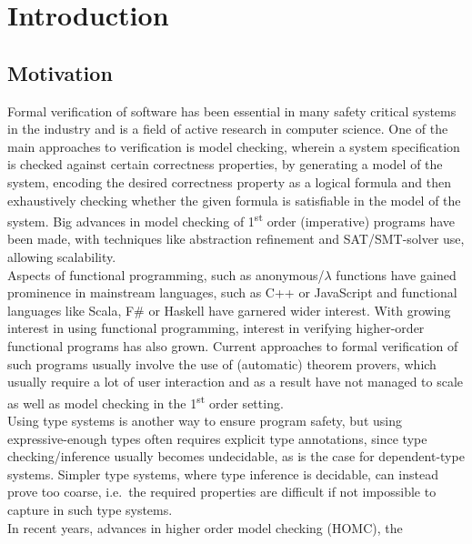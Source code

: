 \documentclass[a4paper, 12pt, twoside]{style/ociamthesis}
\theoremstyle{plain}
\theoremstyle{definition}
\theoremstyle{remark}
\begin{document}
 \hypersetup{linkcolor=cyan} 

\chapter{Introduction}\label{introduction}

\label{chap:intro}

\section{Motivation}\label{motivation}

Formal verification of software has been essential in many safety
critical systems in the industry and is a field of active research in
computer science. One of the main approaches to verification is model
checking, wherein a system specification is checked against certain
correctness properties, by generating a model of the system, encoding
the desired correctness property as a logical formula and then
exhaustively checking whether the given formula is satisfiable in the
model of the system. Big advances in model checking of
1\textsuperscript{st} order (imperative) programs have been made, with
techniques like abstraction refinement and SAT/SMT-solver use, allowing
scalability.\\
Aspects of functional programming, such as anonymous/\(\lambda\)
functions have gained prominence in mainstream languages, such as C++ or
JavaScript and functional languages like Scala, F\# or Haskell have
garnered wider interest. With growing interest in using functional
programming, interest in verifying higher-order functional programs has
also grown. Current approaches to formal verification of such programs
usually involve the use of (automatic) theorem provers, which usually
require a lot of user interaction and as a result have not managed to
scale as well as model checking in the 1\textsuperscript{st} order
setting.\\
Using type systems is another way to ensure program safety, but using
expressive-enough types often requires explicit type annotations, since
type checking/inference usually becomes undecidable, as is the case for
dependent-type systems. Simpler type systems, where type inference is
decidable, can instead prove too coarse, i.e.~the required properties
are difficult if not impossible to capture in such type systems.\\
In recent years, advances in higher order model checking (HOMC), the
\end{document}
